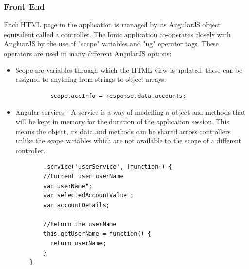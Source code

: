 \subsubsection{Front End}
    Each HTML page in the application is managed by its AngularJS object equivalent called a controller.
    The Ionic application co-operates closely with AngluarJS by the use of "scope" variables and "ng" operator tags.
    These operators are used in many different AngularJS options:
    \begin{itemize}
        \item Scope are variables through which the HTML view is updated. these can be assigned to anything from strings to object arrays.
\begin{verbatim}
          scope.accInfo = response.data.accounts;
\end{verbatim}

        \item Angular services - A service is a way of modelling a object and methods that will be kept in memory for the duration of the application session. This means the object, its data and methods can be shared across controllers unlike the scope variables which are not available to the scope of a different controller.

\begin{verbatim}
        .service('userService', [function() {
        //Current user userName
        var userName";
        var selectedAccountValue ;
        var accountDetails;

        //Return the userName
        this.getUserName = function() {
          return userName;
        }
    }
\end{verbatim}


\end{itemize}
